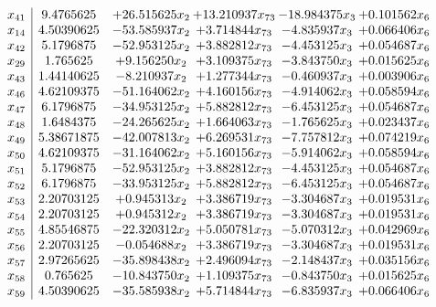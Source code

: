 \documentclass[11pt]{article}
\begin{document}
\[\begin{array}{c| c c@{\hskip 2pt} c@{\hskip 2pt} c@{\hskip 2pt} c@{\hskip 2pt} }
 x_{41}   &  9.4765625 & + 26.515625 x_{2} & + 13.210937 x_{73} & -18.984375 x_{3} & + 0.101562 x_{6}\\
 x_{14}   &  4.50390625 & -53.585937 x_{2} & + 3.714844 x_{73} & -4.835937 x_{3} & + 0.066406 x_{6}\\
 x_{42}   &  5.1796875 & -52.953125 x_{2} & + 3.882812 x_{73} & -4.453125 x_{3} & + 0.054687 x_{6}\\
 x_{29}   &  1.765625 & + 9.156250 x_{2} & + 3.109375 x_{73} & -3.843750 x_{3} & + 0.015625 x_{6}\\
 x_{43}   &  1.44140625 & -8.210937 x_{2} & + 1.277344 x_{73} & -0.460937 x_{3} & + 0.003906 x_{6}\\
 x_{46}   &  4.62109375 & -51.164062 x_{2} & + 4.160156 x_{73} & -4.914062 x_{3} & + 0.058594 x_{6}\\
 x_{47}   &  6.1796875 & -34.953125 x_{2} & + 5.882812 x_{73} & -6.453125 x_{3} & + 0.054687 x_{6}\\
 x_{48}   &  1.6484375 & -24.265625 x_{2} & + 1.664063 x_{73} & -1.765625 x_{3} & + 0.023437 x_{6}\\
 x_{49}   &  5.38671875 & -42.007813 x_{2} & + 6.269531 x_{73} & -7.757812 x_{3} & + 0.074219 x_{6}\\
 x_{50}   &  4.62109375 & -31.164062 x_{2} & + 5.160156 x_{73} & -5.914062 x_{3} & + 0.058594 x_{6}\\
 x_{51}   &  5.1796875 & -52.953125 x_{2} & + 3.882812 x_{73} & -4.453125 x_{3} & + 0.054687 x_{6}\\
 x_{52}   &  6.1796875 & -33.953125 x_{2} & + 5.882812 x_{73} & -6.453125 x_{3} & + 0.054687 x_{6}\\
 x_{53}   &  2.20703125 & + 0.945313 x_{2} & + 3.386719 x_{73} & -3.304687 x_{3} & + 0.019531 x_{6}\\
 x_{54}   &  2.20703125 & + 0.945312 x_{2} & + 3.386719 x_{73} & -3.304687 x_{3} & + 0.019531 x_{6}\\
 x_{55}   &  4.85546875 & -22.320312 x_{2} & + 5.050781 x_{73} & -5.070312 x_{3} & + 0.042969 x_{6}\\
 x_{56}   &  2.20703125 & -0.054688 x_{2} & + 3.386719 x_{73} & -3.304687 x_{3} & + 0.019531 x_{6}\\
 x_{57}   &  2.97265625 & -35.898438 x_{2} & + 2.496094 x_{73} & -2.148437 x_{3} & + 0.035156 x_{6}\\
 x_{58}   &  0.765625 & -10.843750 x_{2} & + 1.109375 x_{73} & -0.843750 x_{3} & + 0.015625 x_{6}\\
 x_{59}   &  4.50390625 & -35.585938 x_{2} & + 5.714844 x_{73} & -6.835937 x_{3} & + 0.066406 x_{6}\\

\end{array}\]
\end{document}
